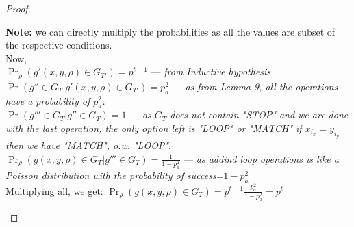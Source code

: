 \documentclass{article}
\begin{document}
\begin{proof}
\begin{enumerate}
\begin{enumerate}
            \textbf{Note:} we can directly multiply the probabilities as all the
            values are subset of the respective conditions.\\
            Now,\\
            $\Pr_\rho(g'(x,y,\rho)\in G_{T'})=p^{t-1}$ --- \textit{from Inductive 
            hypothesis}\\
            $\Pr(g''\in G_T|g'(x,y,\rho)\in G_{T'})=p_a^2$ --- \textit{as from 
            Lemma 9, all the operations have a probability of $p_a^2$.}\\
            $\Pr(g'''\in G_T|g''\in G_T)=1$ --- \textit{as $G_T$ does not 
            contain "STOP" and we are done with the last operation, the only 
            option left is "LOOP" or "MATCH" if $x_{i_x}=y_{i_y}$ then we have 
            "MATCH", o.w. "LOOP"}. \\
            $\Pr_\rho(g(x,y,\rho)\in G_T|g'''\in G_T)=\frac{1}{1-p_a^2}$ ---
            \textit{as addind loop operations is like a Poisson distribution 
            with the probability of success=$1-p_a^2$}\\
            Multiplying all, we get:
            $\Pr_\rho(g(x,y,\rho)\in G_T)=p^{t-1}\frac{p_a^2}{1-p_a^2}=p^t$            

        \end{enumerate}
    

\end{enumerate}
\end{proof}
\end{document}
